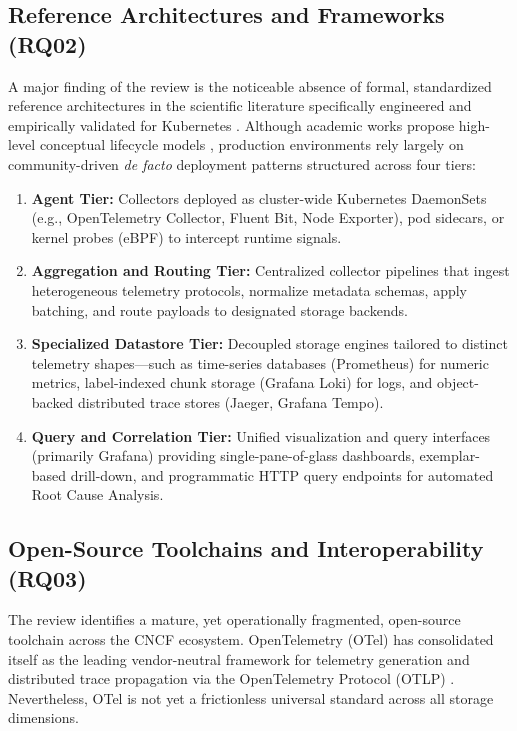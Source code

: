 \subsection{Reference Architectures and Frameworks (RQ02)}
A major finding of the review is the noticeable absence of formal, standardized reference architectures in the scientific literature specifically engineered and empirically validated for Kubernetes \cite{araujo_2024, kosinska_2023}. Although academic works propose high-level conceptual lifecycle models \cite{araujo_2024, han_2024}, production environments rely largely on community-driven \textit{de facto} deployment patterns structured across four tiers:
\begin{enumerate}
    \item \textbf{Agent Tier:} Collectors deployed as cluster-wide Kubernetes DaemonSets (e.g., OpenTelemetry Collector, Fluent Bit, Node Exporter), pod sidecars, or kernel probes (eBPF) to intercept runtime signals.
    \item \textbf{Aggregation and Routing Tier:} Centralized collector pipelines that ingest heterogeneous telemetry protocols, normalize metadata schemas, apply batching, and route payloads to designated storage backends.
    \item \textbf{Specialized Datastore Tier:} Decoupled storage engines tailored to distinct telemetry shapes---such as time-series databases (Prometheus) for numeric metrics, label-indexed chunk storage (Grafana Loki) for logs, and object-backed distributed trace stores (Jaeger, Grafana Tempo).
    \item \textbf{Query and Correlation Tier:} Unified visualization and query interfaces (primarily Grafana) providing single-pane-of-glass dashboards, exemplar-based drill-down, and programmatic HTTP query endpoints for automated Root Cause Analysis.
\end{enumerate}

\subsection{Open-Source Toolchains and Interoperability (RQ03)}
The review identifies a mature, yet operationally fragmented, open-source toolchain across the CNCF ecosystem. OpenTelemetry (OTel) has consolidated itself as the leading vendor-neutral framework for telemetry generation and distributed trace propagation via the OpenTelemetry Protocol (OTLP) \cite{kosinska_2023, faseeha_2025}. Nevertheless, OTel is not yet a frictionless universal standard across all storage dimensions.

